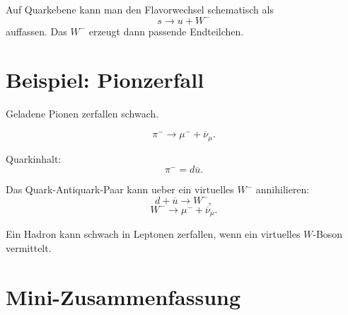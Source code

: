 \begin{conceptbox}
Auf Quarkebene kann man den Flavorwechsel schematisch als
\[
    s \rightarrow u+W^-
\]
auffassen.
Das $W^-$ erzeugt dann passende Endteilchen.
\end{conceptbox}

\section{Beispiel: Pionzerfall}

Geladene Pionen zerfallen schwach.

\begin{formulabox}
\[
    \pi^- \rightarrow \mu^- + \overline{\nu}_\mu.
\]
\end{formulabox}

\begin{conceptbox}
Quarkinhalt:
\[
    \pi^- = d\overline{u}.
\]

Das Quark-Antiquark-Paar kann ueber ein virtuelles $W^-$ annihilieren:
\[
    d+\overline{u}\rightarrow W^-,
\]
\[
    W^- \rightarrow \mu^-+\overline{\nu}_\mu.
\]
\end{conceptbox}

\begin{examtipbox}
Ein Hadron kann schwach in Leptonen zerfallen, wenn ein virtuelles $W$-Boson
vermittelt.
\end{examtipbox}

\section{Mini-Zusammenfassung}

